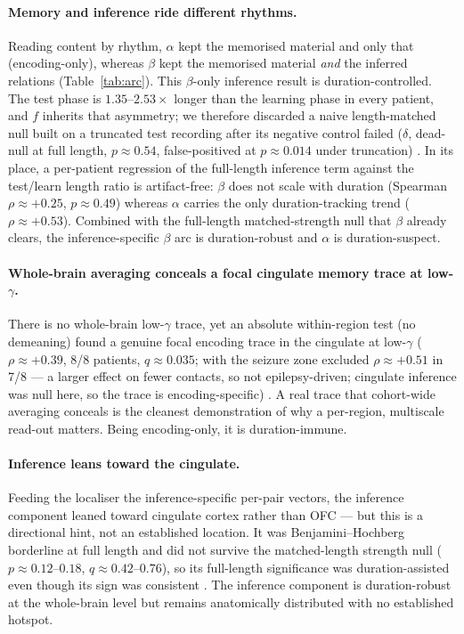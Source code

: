 \documentclass[11pt]{article}
\newcommand{\tab}[1]{Table~\ref{#1}}
\begin{document}
\paragraph{Memory and inference ride different rhythms.}
Reading content by rhythm, $\alpha$ kept the memorised material and only that
(encoding-only), whereas $\beta$ kept the memorised material \emph{and} the
inferred relations (\tab{tab:arc}). This $\beta$-only inference result is
duration-controlled. The test phase is $1.35$--$2.53\times$ longer than the
learning phase in every patient, and $f$ inherits that asymmetry; we therefore
discarded a naive length-matched null built on a truncated test recording after
its negative control failed ($\delta$, dead-null at full length, $p\approx0.54$,
false-positived at $p\approx0.014$ under truncation)
. In its place, a per-patient regression of the full-length inference term
against the test/learn length ratio is artifact-free: $\beta$ does not scale with
duration (Spearman $\rho\approx+0.25$, $p\approx0.49$) whereas $\alpha$ carries
the only duration-tracking trend ($\rho\approx+0.53$). Combined with the
full-length matched-strength null that $\beta$ already clears, the
inference-specific $\beta$ arc is duration-robust and $\alpha$ is
duration-suspect.

\paragraph{Whole-brain averaging conceals a focal cingulate memory trace at
low-\texorpdfstring{$\gamma$}{gamma}.}
There is no whole-brain low-$\gamma$ trace, yet an absolute within-region test
(no demeaning) found a genuine focal encoding trace in the cingulate at
low-$\gamma$ ($\rho\approx+0.39$, 8/8 patients, $q\approx0.035$; with the
seizure zone excluded $\rho\approx+0.51$ in 7/8 --- a larger effect on fewer
contacts, so not epilepsy-driven; cingulate inference was null here, so the trace
is encoding-specific)
. A real trace that cohort-wide averaging conceals is the cleanest demonstration
of why a per-region, multiscale read-out matters. Being encoding-only, it is
duration-immune.

\paragraph{Inference leans toward the cingulate.}
Feeding the localiser the inference-specific per-pair vectors, the inference
component leaned toward cingulate cortex rather than OFC --- but this is a
directional hint, not an established location. It was Benjamini--Hochberg
borderline at full length and did not survive the matched-length strength null
($p\approx0.12$--$0.18$, $q\approx0.42$--$0.76$), so its full-length significance
was duration-assisted even though its sign was consistent
. The inference component is duration-robust at the whole-brain level but remains
anatomically distributed with no established hotspot.
\end{document}
